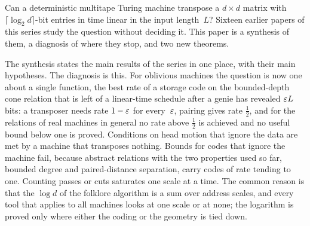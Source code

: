 Can a deterministic multitape Turing machine transpose a $d\times d$ matrix with $\lceil\log_2d\rceil$-bit entries in
time linear in the input length~$L$? Sixteen earlier papers of this series study the question without deciding it. This
paper is a synthesis of them, a diagnosis of where they stop, and two new theorems.

The synthesis states the main results of the series in one place, with their main hypotheses. The diagnosis is
this. For oblivious machines the question is now one about a single function, the best rate of a storage code on the
bounded-depth cone relation that is left of a linear-time schedule after a genie has revealed $\varepsilon L$ bits: a
transposer needs rate $1-\varepsilon$ for every~$\varepsilon$, pairing gives rate $\tfrac12$, and for the relations of real machines
in general no rate above $\tfrac12$ is achieved and no useful bound below one is proved. Conditions on head motion that
ignore the data are met by a machine that transposes nothing. Bounds for codes that ignore the machine fail, because
abstract relations with the two properties used so far, bounded degree and paired-distance separation, carry codes of
rate tending to one. Counting passes or cuts saturates one scale at a time. The common reason is that the $\log d$ of
the folklore algorithm is a sum over address scales, and every tool that applies to all machines looks at one scale or
at none; the logarithm is proved only where either the coding or the geometry is tied down.

